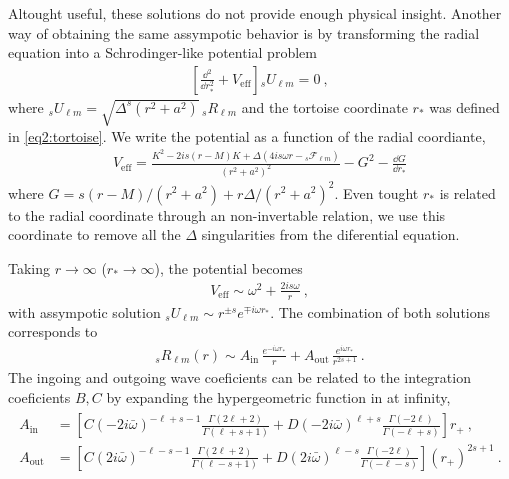 Altought useful, these solutions do not provide enough physical insight. Another way of obtaining the same assympotic behavior is by transforming the radial equation into a Schrodinger-like potential problem
\begin{align}
    \label{eq3:D2PlusVeff}
    \left[ \frac{\dd^2}{\dd r_{*}^2} + V_\mathrm{eff} \right] {}_{s}U_{\ell m} = 0 ~,
\end{align}
where ${}_{s}U_{\ell m}=\sqrt{\Delta^s (r^2 + a^2)} \,{}_{s}R_{\ell m}$ and the tortoise coordinate $r_*$ was defined in \eqref{eq2:tortoise}.
We write the potential as a function of the radial coordiante,
\begin{align}
    V_\mathrm{eff} = \frac{K^2 - 2 i s (r-M) K + \Delta ( 4 i s \omega r - {}_{s}\mathscr{F}_{\ell m} )}{(r^2+a^2)^2} - G^2 - \frac{\dd G}{\dd r_{*}}
\end{align}
where $G = s(r-M)/(r^2+a^2)+ r \Delta/(r^2+a^2)^2$.
Even tought $r_*$ is related to the radial coordinate through an non-invertable relation, we use this coordinate to remove all the $\Delta$ singularities from the diferential equation. 

Taking $r\to\infty$ ($r_{*}\to\infty$), the potential becomes
\begin{align}
    V_\mathrm{eff} \sim \omega^2 + \frac{2 i s \omega}{r} ~,
\end{align}
with assympotic solution ${}_{s}U_{\ell m}\sim r^{\pm s} e^{\mp i \omega r_{*}}$.
The combination of both solutions corresponds to
\begin{align}
    {}_{s}R_{\ell m}(r) \sim A_\mathrm{in}\, \frac{e^{-i \omega r_*}}{r} + A_\mathrm{out}\, \frac{e^{i \omega r_*}}{r^{2s+1}} ~.
    \label{eq3:asymptoticR}
\end{align}
The ingoing and outgoing wave coeficients can be related to the integration coeficients $B, C$ by expanding the hypergeometric function in  at infinity,
\begin{align}
    \begin{split}
    A_\mathrm{in} &= \left[ C (-2 i \bar{\omega})^{-\ell+s-1} \frac{\Gamma(2\ell+2)}{\Gamma(\ell+s+1)} + D (-2 i \bar{\omega})^{\ell+s} \frac{\Gamma(-2\ell)}{\Gamma(-\ell+s)} \right] r_{+} ~, \\
    A_\mathrm{out} &= \left[ C (2 i \bar{\omega})^{-\ell-s-1} \frac{\Gamma(2\ell+2)}{\Gamma(\ell-s+1)} + D (2 i \bar{\omega})^{\ell-s} \frac{\Gamma(-2\ell)}{\Gamma(-\ell-s)} \right] (r_{+})^{2s+1}  ~.
    \end{split}
\end{align}

